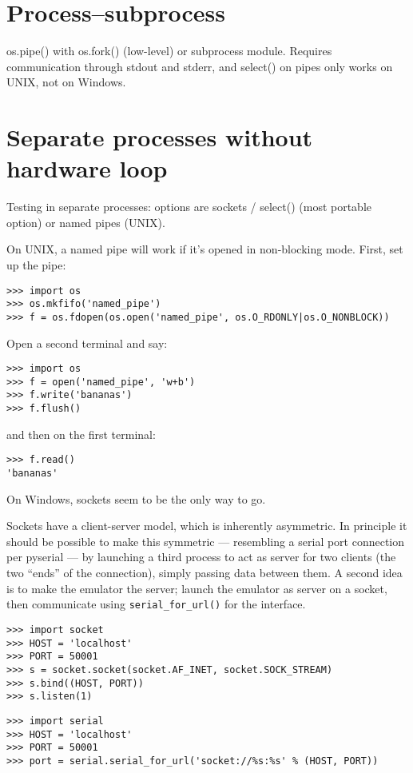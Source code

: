 \documentclass[pdftex,oneside,12pt,a4paper]{book}
\begin{document}
\section{Process--subprocess}
os.pipe() with os.fork() (low-level) or subprocess module.  Requires communication through stdout and stderr, and select() on pipes only works on UNIX, not on Windows.

\section{Separate processes without hardware loop}

Testing in separate processes:  options are sockets / select() (most portable option) or named pipes (UNIX).

On UNIX, a named pipe will work if it's opened in non-blocking mode.  First, set up the pipe:
\begin{verbatim}
>>> import os
>>> os.mkfifo('named_pipe')
>>> f = os.fdopen(os.open('named_pipe', os.O_RDONLY|os.O_NONBLOCK))
\end{verbatim}
Open a second terminal and say:
\begin{verbatim}
>>> import os
>>> f = open('named_pipe', 'w+b')
>>> f.write('bananas')
>>> f.flush()
\end{verbatim}
and then on the first terminal:
\begin{verbatim}
>>> f.read()
'bananas'
\end{verbatim}

On Windows, sockets seem to be the only way to go.

Sockets have a client-server model, which is inherently asymmetric.  In principle it should be possible to make this symmetric --- resembling a serial port connection per pyserial --- by launching a third process to act as server for two clients (the two ``ends'' of the connection), simply passing data between them.  A second idea is to make the emulator the server;  launch the emulator as server on a socket, then communicate using \verb|serial_for_url()| for the interface.

\begin{verbatim}
>>> import socket
>>> HOST = 'localhost'
>>> PORT = 50001
>>> s = socket.socket(socket.AF_INET, socket.SOCK_STREAM)
>>> s.bind((HOST, PORT))
>>> s.listen(1)
\end{verbatim}

\begin{verbatim}
>>> import serial
>>> HOST = 'localhost'
>>> PORT = 50001
>>> port = serial.serial_for_url('socket://%s:%s' % (HOST, PORT))
\end{verbatim}
\end{document}
